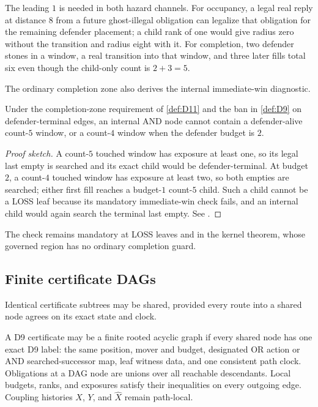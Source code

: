 The leading $1$ is needed in both hazard channels.  For occupancy, a legal
real reply at distance $8$ from a future ghost-illegal obligation can legalize
that obligation for the remaining defender placement; a child rank of one
would give radius zero without the transition and radius eight with it.  For
completion, two defender stones in a window, a real transition into that
window, and three later fills total six even though the child-only count is
$2+3=5$.

The ordinary completion zone also derives the internal immediate-win
diagnostic.

\begin{lemma}
\label{lem:L14}
Under the completion-zone requirement of \cref{def:D11} and the ban in
\cref{def:D9} on defender-terminal edges, an internal AND node cannot contain
a defender-alive count-$5$ window, or a count-$4$ window when the defender
budget is $2$.
\end{lemma}

\begin{proof}[Proof sketch]
A count-$5$ touched window has exposure at least one, so its legal last empty
is searched and its exact child would be defender-terminal.  At budget $2$, a
count-$4$ touched window has exposure at least two, so both empties are
searched; either first fill reaches a budget-$1$ count-$5$ child.  Such a child
cannot be a LOSS leaf because its mandatory immediate-win check fails, and an
internal child would again search the terminal last empty.  See
\cite{hexobot-companions}.
\end{proof}

The check remains mandatory at LOSS leaves and in the kernel theorem, whose
governed region has no ordinary completion guard.

\subsection{Finite certificate DAGs}

Identical certificate subtrees may be shared, provided every route into a
shared node agrees on its exact state and clock.

\begin{definition}
\label{def:D18}
A D9 certificate may be a finite rooted acyclic graph if every shared node
has one exact D9 label: the same position, mover and budget, designated OR
action or AND searched-successor map, leaf witness data, and one consistent
path clock.  Obligations at a DAG node are unions over all reachable
descendants.  Local budgets, ranks, and exposures satisfy their inequalities
on every outgoing edge.  Coupling histories $X$, $Y$, and $\widehat X$ remain
path-local.
\end{definition}


